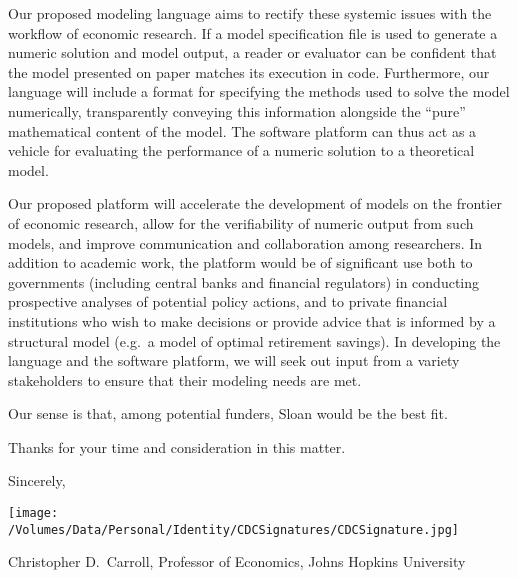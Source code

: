 \documentclass[11pt,pdftex,letterpaper]{article}
\begin{document}




Our proposed modeling language aims to rectify these systemic issues with the workflow of economic research. If a model specification file is used to generate a numeric solution and model output, a reader or evaluator can be confident that the model presented on paper matches its execution in code. Furthermore, our language will include a format for specifying the methods used to solve the model numerically, transparently conveying this information alongside the ``pure'' mathematical content of the model. The software platform can thus act as a vehicle for evaluating the performance of a numeric solution to a theoretical model.

Our proposed platform will accelerate the development of models on the frontier of economic research, allow for the verifiability of numeric output from such models, and improve communication and collaboration among researchers. In addition to academic work, the platform would be of significant use both to governments (including central banks and financial regulators) in conducting prospective analyses of potential policy actions, and to private financial institutions who wish to make decisions or provide advice that is informed by a structural model (e.g.\ a model of optimal retirement savings). In developing the language and the software platform, we will seek out input from a variety stakeholders to ensure that their modeling needs are met.

Our sense is that, among potential funders, Sloan would be the best fit.

Thanks for your time and consideration in this matter.

\vspace{0.5cm}

{\parskip=2pt Sincerely,

  \texttt{[image: /Volumes/Data/Personal/Identity/CDCSignatures/CDCSignature.jpg]}
  
Christopher D.\ Carroll, Professor of Economics, Johns Hopkins University}
\end{document}
